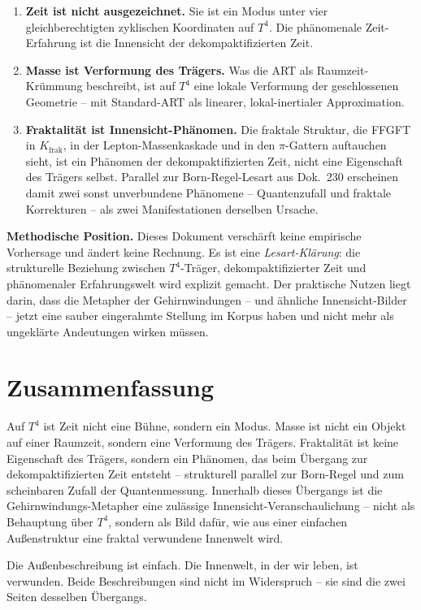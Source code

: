\begin{enumerate}[leftmargin=2em,itemsep=4pt,topsep=4pt]
  \item \textbf{Zeit ist nicht ausgezeichnet.} Sie ist ein Modus
        unter vier gleichberechtigten zyklischen Koordinaten auf
        $T^4$. Die phänomenale Zeit-Erfahrung ist die Innensicht
        der dekompaktifizierten Zeit.

  \item \textbf{Masse ist Verformung des Trägers.} Was die ART als
        Raumzeit-Krümmung beschreibt, ist auf $T^4$ eine lokale
        Verformung der geschlossenen Geometrie -- mit Standard-ART
        als linearer, lokal-inertialer Approximation.

  \item \textbf{Fraktalität ist Innensicht-Phänomen.} Die fraktale
        Struktur, die FFGFT in $K_{\text{frak}}$, in der
        Lepton-Massenkaskade und in den $\pi$-Gattern auftauchen
        sieht, ist ein Phänomen der dekompaktifizierten Zeit, nicht
        eine Eigenschaft des Trägers selbst. Parallel zur
        Born-Regel-Lesart aus Dok.~230 erscheinen damit zwei sonst
        unverbundene Phänomene -- Quantenzufall und fraktale
        Korrekturen -- als zwei Manifestationen derselben Ursache.
\end{enumerate}

\textbf{Methodische Position.} Dieses Dokument verschärft keine
empirische Vorhersage und ändert keine Rechnung. Es ist eine
\emph{Lesart-Klärung}: die strukturelle Beziehung zwischen
$T^4$-Träger, dekompaktifizierter Zeit und phänomenaler
Erfahrungswelt wird explizit gemacht. Der praktische Nutzen liegt
darin, dass die Metapher der Gehirnwindungen -- und ähnliche
Innensicht-Bilder -- jetzt eine sauber eingerahmte Stellung im
Korpus haben und nicht mehr als ungeklärte Andeutungen wirken
müssen.

\section{Zusammenfassung}

Auf $T^4$ ist Zeit nicht eine Bühne, sondern ein Modus. Masse ist
nicht ein Objekt auf einer Raumzeit, sondern eine Verformung des
Trägers. Fraktalität ist keine Eigenschaft des Trägers, sondern ein
Phänomen, das beim Übergang zur dekompaktifizierten Zeit entsteht --
strukturell parallel zur Born-Regel und zum scheinbaren Zufall der
Quantenmessung. Innerhalb dieses Übergangs ist die Gehirnwindungs-Metapher
eine zulässige Innensicht-Veranschaulichung -- nicht als Behauptung
über $T^4$, sondern als Bild dafür, wie aus einer einfachen
Außenstruktur eine fraktal verwundene Innenwelt wird.

Die Außenbeschreibung ist einfach. Die Innenwelt, in der wir leben,
ist verwunden. Beide Beschreibungen sind nicht im Widerspruch -- sie
sind die zwei Seiten desselben Übergangs.

